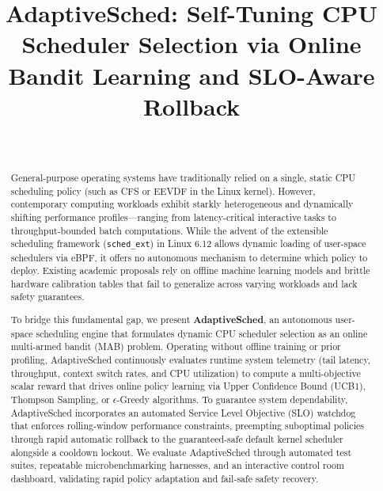 \documentclass[journal]{IEEEtran}
\begin{document}
\title{AdaptiveSched: Self-Tuning CPU Scheduler Selection via Online Bandit Learning and SLO-Aware Rollback}

\author{
    \\
}

\maketitle

\begin{abstract}
General-purpose operating systems have traditionally relied on a single, static CPU scheduling policy (such as CFS or EEVDF in the Linux kernel). However, contemporary computing workloads exhibit starkly heterogeneous and dynamically shifting performance profiles---ranging from latency-critical interactive tasks to throughput-bounded batch computations. While the advent of the extensible scheduling framework (\texttt{sched\_ext}) in Linux 6.12 allows dynamic loading of user-space schedulers via eBPF, it offers no autonomous mechanism to determine which policy to deploy. Existing academic proposals rely on offline machine learning models and brittle hardware calibration tables that fail to generalize across varying workloads and lack safety guarantees. 

To bridge this fundamental gap, we present \textbf{AdaptiveSched}, an autonomous user-space scheduling engine that formulates dynamic CPU scheduler selection as an online multi-armed bandit (MAB) problem. Operating without offline training or prior profiling, AdaptiveSched continuously evaluates runtime system telemetry (tail latency, throughput, context switch rates, and CPU utilization) to compute a multi-objective scalar reward that drives online policy learning via Upper Confidence Bound (UCB1), Thompson Sampling, or $\epsilon$-Greedy algorithms. To guarantee system dependability, AdaptiveSched incorporates an automated Service Level Objective (SLO) watchdog that enforces rolling-window performance constraints, preempting suboptimal policies through rapid automatic rollback to the guaranteed-safe default kernel scheduler alongside a cooldown lockout. We evaluate AdaptiveSched through automated test suites, repeatable microbenchmarking harnesses, and an interactive control room dashboard, validating rapid policy adaptation and fail-safe safety recovery.
\end{abstract}
\end{document}

